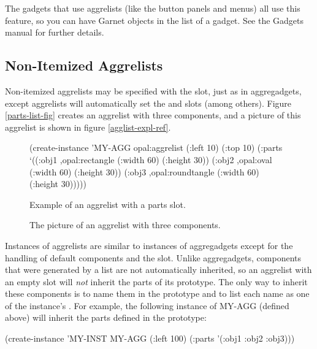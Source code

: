 The gadgets that use aggrelists (like the button panels and menus) all
use this feature, so you can have Garnet objects in the 
list of a gadget.  See the Gadgets manual for further details.


\subsection{Non-Itemized Aggrelists}
\label{non-itemized-sec}
Non-itemized aggrelists may be specified with the  slot,
just as in aggregadgets, except aggrelists will automatically set the
 and  slots (among others).  Figure \ref{parts-list-fig}
creates an aggrelist with three components, and a picture of this
aggrelist is shown in figure \ref{agglist-expl-ref}.

\begin{figure}
\begin{programexample}
(create-instance 'MY-AGG opal:aggrelist
  (:left 10) (:top 10)
  (:parts
   `((:obj1 ,opal:rectangle (:width 60) (:height 30))
     (:obj2 ,opal:oval (:width 60) (:height 30))
     (:obj3 ,opal:roundtangle (:width 60) (:height 30)))))
\end{programexample}
\caption{Example of an aggrelist with a parts slot.}
\end{figure}

\begin{figure}
\begin{center}
\end{center}

\caption{The picture of an aggrelist with three components.}
\end{figure}

Instances of aggrelists are similar to instances of aggregadgets except
for the handling of default components and the 
slot.  Unlike aggregadgets, components that were generated by a
 list are not automatically inherited, so an aggrelist with
an empty  slot will {\it not} inherit the parts of its
prototype.  The only way to inherit these components is to
name them in the prototype and to list each name as one of the instance's
.  For example, the following instance of MY-AGG (defined
above) will inherit the parts defined in the prototype:
\begin{programexample}
(create-instance 'MY-INST MY-AGG
  (:left 100)
  (:parts '(:obj1 :obj2 :obj3)))
\end{programexample}

